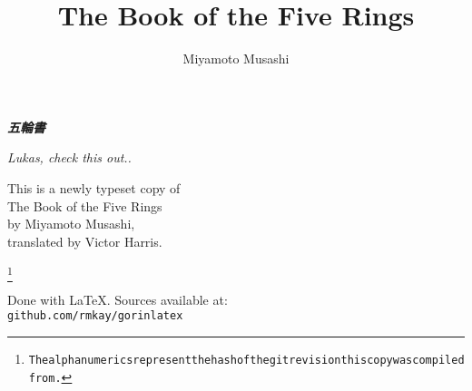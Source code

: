 \documentclass[paper=a6]{book}
\begin{document}
\pagestyle{empty}
\setcounter{secnumdepth}{-1} 
\setlength{\parindent}{0cm}




\vspace*{2cm}
\begin{center}
  \begin{CJK*}{UTF8}{min}
      \textit{\textbf{{\Huge 五輪書}}}
  \end{CJK*}
\end{center}
\cleardoublepage
\vspace*{2cm}
\begin{center}
\textit{Lukas, check this out..}
\end{center}
\clearpage

\begin{center}
\vspace*{1cm}
This is a newly typeset copy of \\ 
The Book of the Five Rings\\ 
by Miyamoto Musashi,\\
translated by Victor Harris.\\
\begin{alltt}
\singlespacing
\centering
\texttt{}\let\thefootnote\relax\footnote{The alphanumerics represent the hash of the git revision this copy was compiled from.}
\end{alltt}
\vfill
Done with \LaTeX. Sources available at:\\
\texttt{github.com/rmkay/gorinlatex}\\

\end{center}

\title{\textbf{The Book of the Five Rings}}
\author{Miyamoto Musashi}
\date{}
\maketitle


{}
\manualmark
\markboth{\spacedlowsmallcaps{\contentsname}}{\spacedlowsmallcaps{\contentsname}}
\clearpage
\tableofcontents 
{}
\cleardoublepage
{}
\renewcommand{\chaptermark}[1]{\markboth{\spacedlowsmallcaps{#1}}{\spacedlowsmallcaps{#1}}}
\renewcommand{\sectionmark}[1]{\markright{\thesection\enspace\spacedlowsmallcaps{#1}}}
\pagestyle{plain}


\setcounter{secnumdepth}{0} 





\end{document}
